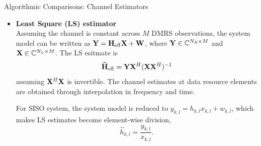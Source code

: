 \documentclass[xcolor=dvipsnames,12pt]{beamer}
\newcommand{\myfootercenter}{ITRI Communication Protocol Development Engineer (M201)}
\newcommand{\setfooter}[1]{\renewcommand{\myfootercenter}{#1}}
\begin{document}
\setfooter{Algorithmic Comparisons}
\begin{frame}{Algorithmic Comparisons: Channel Estimators}
\begin{footnotesize}
    \begin{itemize}
        \item[1.] \textbf{Least Square (LS) estimator} \\
        Assuming the channel is constant across $M$ DMRS observations, the system model can be written as ${\bf Y} = {\bf H}_{\rm{eff}} {\bf X} + {\bf W}$, where ${\bf Y} \in \mathbb{C}^{N_R \times M}$ and ${\bf X} \in \mathbb{C}^{N_L \times M}$.  The LS esitmate is 
        \begin{equation}
            {\widehat{{\bf H}}}_{\rm{eff}} = {\bf Y} {\bf X}^H ({\bf X} {\bf X}^H)^{-1}
        \end{equation}
        assuming ${\bf X}^H {\bf X}$ is invertible.  The channel estimates at data resource elements are obtained through interpolation in frequency and time.

        For SISO system, the system model is reduced to $y_{k,l} = h_{k,l} x_{k,l} + w_{k,l}$, which makes LS estimates become element-wise division,
        \begin{equation}
            \hat{h}_{k,l} = \frac{y_{k,l}}{x_{k,l}}.
        \end{equation}
    \end{itemize}

\end{footnotesize}
\end{frame}
\end{document}
